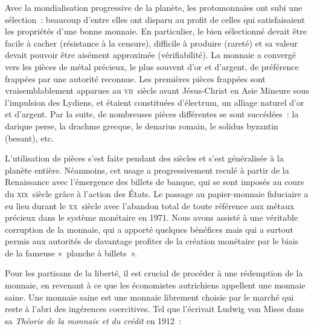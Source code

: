 Avec la mondialisation progressive de la planète, les protomonnaies ont subi une sélection~: beaucoup d'entre elles ont disparu au profit de celles qui satisfaisaient les propriétés d'une bonne monnaie. En particulier, le bien sélectionné devait être facile à cacher (résistance à la censure), difficile à produire (rareté) et sa valeur devait pouvoir être aisément approximée (vérifiabilité). La monnaie a convergé vers les pièces de métal précieux, le plus souvent d'or et d'argent, de préférence frappées par une autorité reconnue. Les premières pièces frappées sont vraisemblablement apparues au \textsc{vii}\ieme{}~siècle avant Jésus-Christ en Asie Mineure sous l'impulsion des Lydiens, et étaient constituées d'électrum, un alliage naturel d'or et d'argent. Par la suite, de nombreuses pièces différentes se sont succédées~: la darique perse, la drachme grecque, le denarius romain, le solidus byzantin (besant), etc.


L'utilisation de pièces s'est faite pendant des siècles et s'est généralisée à la planète entière. Néanmoins, cet usage a progressivement reculé à partir de la Renaissance avec l'émergence des billets de banque, qui se sont imposés au cours du \textsc{xix}\ieme{}~siècle grâce à l'action des États. Le passage au papier-monnaie fiduciaire a eu lieu durant le \textsc{xx}\ieme{}~siècle avec l'abandon total de toute référence aux métaux précieux dans le système monétaire en 1971. Nous avons assisté à une véritable corruption de la monnaie, qui a apporté quelques bénéfices mais qui a surtout permis aux autorités de davantage profiter de la création monétaire par le biais de la fameuse «~planche à billets~». %


Pour les partisans de la liberté, il est crucial de procéder à une rédemption de la monnaie, en revenant à ce que les économistes autrichiens appellent une monnaie saine. Une monnaie saine est une monnaie librement choisie par le marché qui reste à l'abri des ingérences coercitives. Tel que l'écrivait Ludwig von Mises dans sa \emph{Théorie de la monnaie et du crédit} en 1912~:

